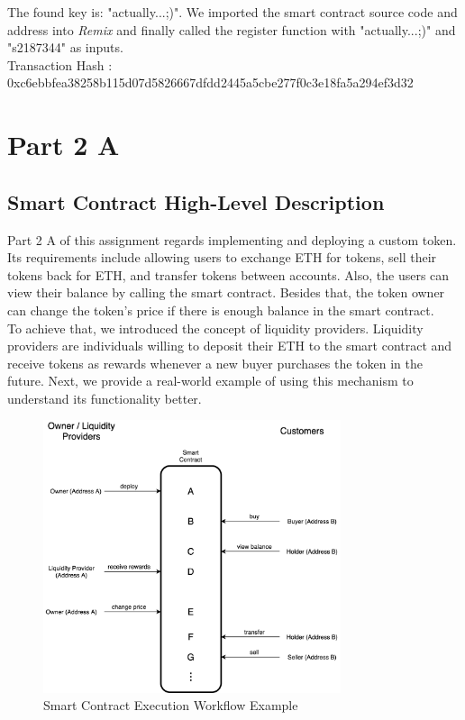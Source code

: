 \documentclass[12pt,a4paper]{article}
\begin{document}
\vspace{5mm}

The found key is: "actually...;)". We imported the smart contract source code
and address into \emph{Remix} and finally called the register function with
"actually...;)" and "s2187344" as inputs. \\

Transaction Hash : 0xc6ebbfea38258b115d07d5826667dfdd2445a5cbe277f0c3e18fa5a294ef3d32

\section*{Part 2 A}

\subsection*{Smart Contract High-Level Description}

Part 2 A of this assignment regards implementing and deploying a custom token.
Its requirements include allowing users to exchange ETH for tokens, sell their
tokens back for ETH, and transfer tokens between accounts. Also, the users can
view their balance by calling the smart contract. Besides that, the token owner
can change the token's price if there is enough balance in the smart contract. \\

To achieve that, we introduced the concept of liquidity providers. Liquidity
providers are individuals willing to deposit their ETH to the smart contract and
receive tokens as rewards whenever a new buyer purchases the token in the
future. Next, we provide a real-world example of using this mechanism to
understand its functionality better. \\

\begin{figure}[htpb]
    \begin{center}
        \includegraphics[height=8cm]{execution_flow.png}
        \caption{Smart Contract Execution Workflow Example}
        \label{fig:smart-contract-example}
    \end{center}
\end{figure} 
\end{document}
